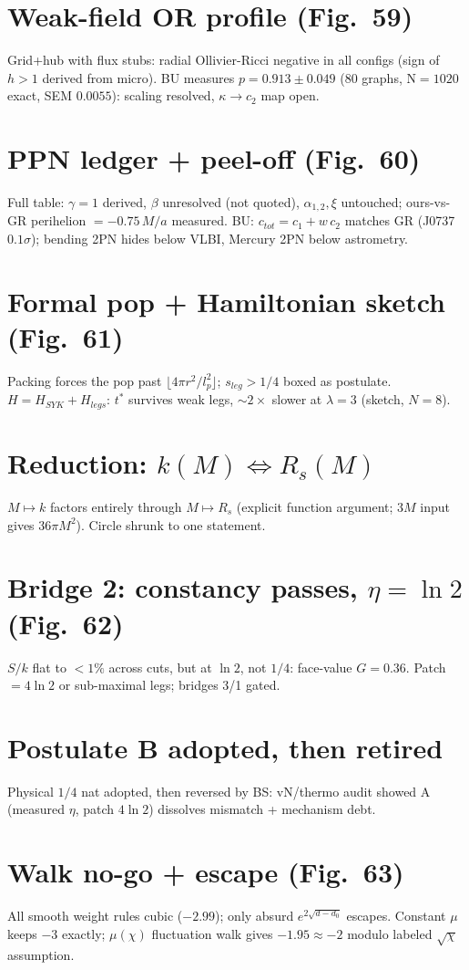 \documentclass[11pt]{article}
\begin{document}
\section{Weak-field OR profile (Fig.~59)}
Grid+hub with flux stubs: radial Ollivier-Ricci negative in all configs
(sign of $h>1$ derived from micro). BU measures $p=0.913\pm0.049$ (80 graphs,
N$=1020$ exact, SEM $0.0055$): scaling resolved, $\kappa\to c_2$ map open.

\section{PPN ledger + peel-off (Fig.~60)}
Full table: $\gamma=1$ derived, $\beta$ unresolved (not quoted),
$\alpha_{1,2},\xi$ untouched; ours-vs-GR perihelion $=-0.75\,M/a$ measured.
BU: $c_{tot}=c_1+w\,c_2$ matches GR (J0737 $0.1\sigma$); bending 2PN hides
below VLBI, Mercury 2PN below astrometry.

\section{Formal pop + Hamiltonian sketch (Fig.~61)}
Packing forces the pop past $\lfloor4\pi r^2/l_p^2\rfloor$; $s_{leg}>1/4$
boxed as postulate. $H=H_{SYK}+H_{legs}$: $t^*$ survives weak legs,
$\sim2\times$ slower at $\lambda=3$ (sketch, $N=8$).

\section{Reduction: $k(M)\iff R_s(M)$}
$M\mapsto k$ factors entirely through $M\mapsto R_s$ (explicit function
argument; $3M$ input gives $36\pi M^2$). Circle shrunk to one statement.

\section{Bridge 2: constancy passes, $\eta=\ln2$ (Fig.~62)}
$S/k$ flat to $<1\%$ across cuts, but at $\ln2$, not $1/4$: face-value
$G=0.36$. Patch $=4\ln2$ or sub-maximal legs; bridges 3/1 gated.

\section{Postulate B adopted, then retired}
Physical $1/4$ nat adopted, then reversed by BS: vN/thermo audit showed A
(measured $\eta$, patch $4\ln2$) dissolves mismatch + mechanism debt.

\section{Walk no-go + escape (Fig.~63)}
All smooth weight rules cubic ($-2.99$); only absurd $e^{2\sqrt{d-d_0}}$
escapes. Constant $\mu$ keeps $-3$ exactly; $\mu(\chi)$ fluctuation walk
gives $-1.95\approx-2$ modulo labeled $\sqrt\chi$ assumption.
\end{document}
